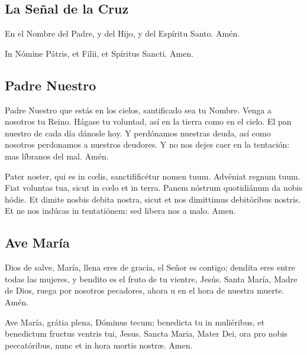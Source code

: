 \documentclass[./devocionario.tex]{subfiles}
\begin{document}
\subsection*{La Señal de la Cruz}
\begin{multicols}{2}
    En el Nombre del Padre, y del Hijo, y del Espíritu Santo. Amén.
    
    \columnbreak
    
    In Nómine Pátris, et Filii, et Spíritus Sancti. Amen.
\end{multicols}

\subsection*{Padre Nuestro}
\begin{multicols}{2}
    Padre Nuestro que estás en los cielos, santificado sea tu Nombre. Venga a nosotros tu Reino. 
    Hágase tu voluntad, así en la tierra como en el cielo. El pan nuestro de cada día dánosle hoy. 
    Y perdónamos nuestras deuda, así como nosotros perdonamos a nuestros deudores. 
    Y no nos dejes caer en la tentación: mas líbranos del mal. Amén.
    
    \columnbreak
    
    Pater noster, qui es in cœlis, sanctifificétur nomen tuum. Advéniat regnum tuum. 
    Fiat voluntas tua, sicut in cœlo et in terra. Panem nóstrum quotidiánum da nobis hódie. 
    Et dimite nosbis debita nostra, sicut et nos dimittimus debitóribus nostris. 
    Et ne nos indúcas in tentatiónem: sed libera nos a malo. Amen.
\end{multicols}

\subsection*{Ave María}
\begin{multicols}{2}
    Dios de salve, María, llena eres de gracia, el Señor es contigo; dendita eres entre todas las mujeres, 
    y bendito es el fruto de tu vientre, Jesús. Santa María, Madre de Dios, ruega por nosotros pecadores, 
    ahora u en el hora de nuestra muerte. Amén.
    
    \columnbreak
    
    Ave María, grátia plena, Dóminus tecum; benedicta tu in muliéribus, et benedictum fructus ventris tui, 
    Jesus. Sancta Maria, Mater Dei, ora pro nobis peccatóribus, nunc et in hora mortis nostræ. Amen.
\end{multicols}
\end{document}

